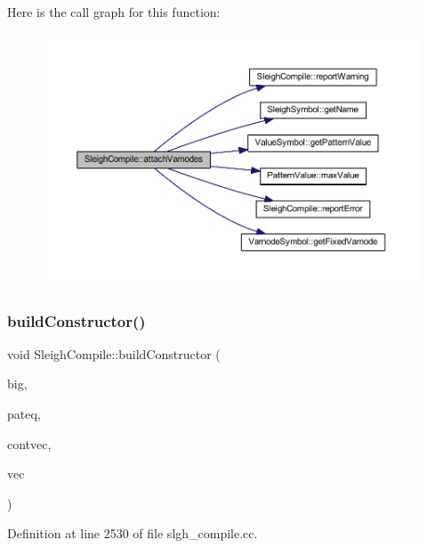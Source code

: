 Here is the call graph for this function\+:
\nopagebreak
\begin{figure}[H]
\begin{center}
\leavevmode
\includegraphics[width=350pt]{class_sleigh_compile_a3bf9c02ba7c649ca151116c181817555_cgraph}
\end{center}
\end{figure}
\mbox{\label{class_sleigh_compile_a2d11b92b6c5db7386b319ad88202c2b2}} 
\subsubsection{\texorpdfstring{buildConstructor()}{buildConstructor()}}
{\footnotesize\ttfamily void Sleigh\+Compile\+::build\+Constructor (\begin{DoxyParamCaption}\item[{\mbox{\hyperlink{class_constructor}{Constructor}} $\ast$}]{big,  }\item[{\mbox{\hyperlink{class_pattern_equation}{Pattern\+Equation}} $\ast$}]{pateq,  }\item[{vector$<$ \mbox{\hyperlink{class_context_change}{Context\+Change}} $\ast$ $>$ $\ast$}]{contvec,  }\item[{\mbox{\hyperlink{class_section_vector}{Section\+Vector}} $\ast$}]{vec }\end{DoxyParamCaption})}



Definition at line 2530 of file slgh\+\_\+compile.\+cc.


